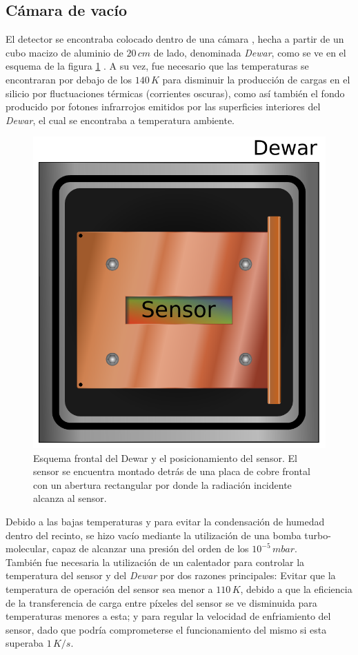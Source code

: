 \subsection{Cámara de vacío}
\noindent El detector se encontraba colocado dentro de una cámara%
, hecha a partir de un cubo macizo de aluminio de $20\,\si{cm}$ de lado, denominada \textit{Dewar}, como se ve en el esquema de la figura \ref{fig:FrontalDewarYSensor} . A su vez, fue necesario que las temperaturas se encontraran por debajo de los $140\,\si{K}$ para disminuir la producción de cargas en el silicio por fluctuaciones térmicas (corrientes oscuras), como así también el fondo producido por fotones infrarrojos emitidos por las superficies interiores del \textit{Dewar}, el cual se encontraba a temperatura ambiente. 
\begin{figure}%
    \centering
    \includegraphics[scale=0.7]{Figs/Frontal_Dewar_Sensor.pdf}
    \caption{\footnotesize{Esquema frontal del Dewar y el posicionamiento del sensor. El sensor se encuentra montado detrás de una placa de cobre frontal con un abertura rectangular por donde la radiación incidente alcanza al sensor.}}
    \label{fig:FrontalDewarYSensor}
\end{figure}
Debido a las bajas temperaturas y para evitar la condensación de humedad dentro del recinto, se hizo vacío mediante la utilización de una bomba turbo-molecular, capaz de alcanzar una presión del orden de los $10^{-5}\,\si{mbar}$.\\
\indent También fue necesaria la utilización de un calentador para controlar la temperatura del sensor y del \textit{Dewar} por dos razones principales: Evitar que la temperatura de operación del sensor sea menor a $110\,\si{K}$, debido a que la eficiencia de la transferencia de carga entre píxeles del sensor se ve disminuida para temperaturas menores a esta; y para regular la velocidad de enfriamiento del sensor, dado que podría comprometerse el funcionamiento del mismo si esta superaba $1\,\si{K/s}$.\\
